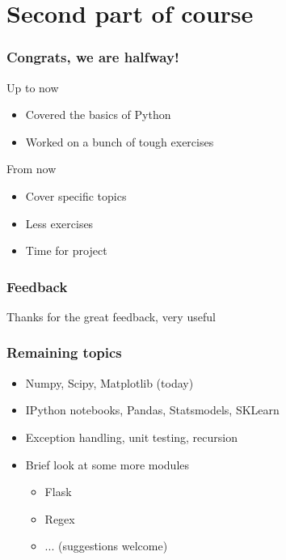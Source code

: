 \section{Second part of course} %
\label{sec:second_part_of_course}

\begin{frame}\frametitle{Congrats, we are halfway!}

    Up to now
    \begin{itemize}
        \item Covered the basics of Python
        \item Worked on a bunch of tough exercises
    \end{itemize}

    From now
    \begin{itemize}
        \item Cover specific topics
        \item Less exercises
        \item Time for project
    \end{itemize}

\end{frame}

\begin{frame}\frametitle{Feedback}

    Thanks for the great feedback, very useful

\end{frame}

\begin{frame}\frametitle{Remaining topics}

    \begin{itemize}
        \item Numpy, Scipy, Matplotlib (today)
        \item IPython notebooks, Pandas, Statsmodels, SKLearn
        \item Exception handling, unit testing, recursion
        \item Brief look at some more modules
        \begin{itemize}
            \item Flask
            \item Regex
            \item ... (suggestions welcome)
        \end{itemize}

    \end{itemize}


\end{frame}


